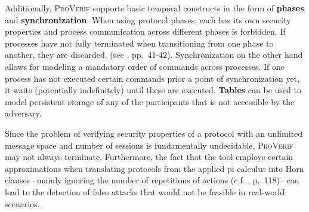 Additionally, \textsc{ProVerif} supports basic temporal constructs in the form of \textbf{phases} and \textbf{synchronization}.
When using protocol phases, each has its own security properties and process communication across different phases is forbidden.
If processes have not fully terminated when transitioning from one phase to another, they are discarded. (see \cite{blanchet2020proverif}, pp.~41-42).
Synchronization on the other hand allows for modeling a mandatory order of commands across processes.
If one process has not executed certain commands prior a point of synchronization yet, it waits (potentially indefinitely) until these are executed.
\textbf{Tables} can be used to model persistent storage of any of the participants that is not accessible by the adversary.

Since the problem of verifying security properties of a protocol with an unlimited message space and number of sessions is fundamentally undecidable, \textsc{ProVerif} may not always terminate.
Furthermore, the fact that the tool employs certain approximations when translating protocols from the applied pi calculus into Horn clauses --mainly ignoring the number of repetitions of actions (c.f. \cite{blanchet2020proverif}, p.~118)-- can lead to the detection of false attacks that would not be feasible in real-world scenarios.

